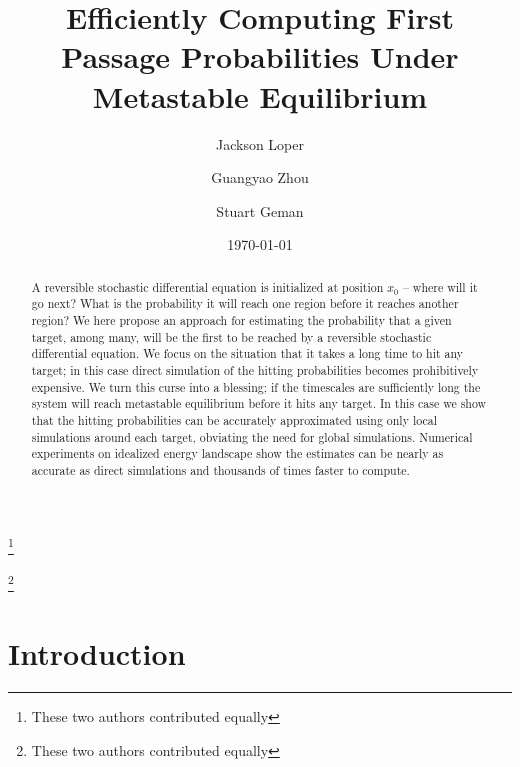 \documentclass[12pt, nofootinbib,english, amsmath, amssymb, aps, priprint, graphicx,floatfix]{revtex4-1}
\theoremstyle{plain}
\theoremstyle{definition}
\theoremstyle{plain}
\begin{document}
\title{Efficiently Computing First Passage Probabilities Under Metastable Equilibrium} %

\author{Jackson Loper}
\thanks{These two authors contributed equally}

\author{Guangyao Zhou}
\thanks{These two authors contributed equally}

\author{Stuart Geman}

\date{\today}

\begin{abstract}
	A reversible stochastic differential equation is initialized at position $x_0$ -- where will it go next?  What is the probability it will reach one region before it reaches another region?  We here propose an approach for estimating the probability that a given target, among many, will be the first to be reached by a reversible stochastic differential equation.   We focus on the situation that it takes a long time to hit any target; in this case direct simulation of the hitting probabilities becomes prohibitively expensive.  We turn this curse into a blessing; if the timescales are sufficiently long the system will reach metastable equilibrium before it hits any target.  In this case we show that the hitting probabilities can be accurately approximated using only local simulations around each target, obviating the need for global simulations.  Numerical experiments on idealized energy landscape show the estimates can be nearly as accurate as direct simulations and thousands of times faster to compute.
\end{abstract}

\pacs{}%

\maketitle %

\section{Introduction}
\label{sec:Introduction}
\end{document}
